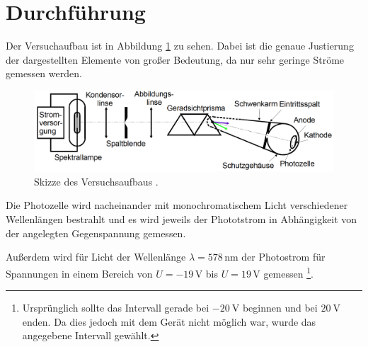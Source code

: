 \section{Durchführung}
\label{sec:Durchführung}

Der Versuchaufbau ist in Abbildung \ref{fig:aufbau} zu sehen. Dabei ist die  genaue Justierung
der dargestellten Elemente von großer Bedeutung, da nur sehr geringe Ströme gemessen
werden.

\begin{figure}
  \centering
  \includegraphics[width=\textwidth]{data/aufbau.png}
  \caption{Skizze des Versuchsaufbaus \cite{Versuchsanleitung}.}
  \label{fig:aufbau}
\end{figure}

Die Photozelle wird nacheinander mit monochromatischem Licht verschiedener Wellenlängen
bestrahlt und es wird jeweils der Phototstrom in Abhängigkeit von der angelegten
Gegenspannung gemessen.

Außerdem wird für Licht der Wellenlänge $\lambda=578\,$nm der Photostrom für Spannungen
in einem Bereich von $U=-19\,$V bis $U=19\,$V gemessen \footnote{Ursprünglich sollte das Intervall
gerade bei $\SI{-20}{\volt}$ beginnen und bei $\SI{20}{\volt}$ enden. Da dies jedoch mit
dem Gerät nicht möglich war, wurde das angegebene Intervall gewählt.}.
